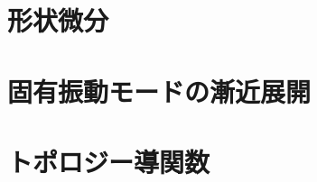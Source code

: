 \documentclass[titlepage,a4paper,12pt,oneside,dvipdfmx]{jsbook}
\begin{document}
\chapter{形状微分}




\chapter{固有振動モードの漸近展開}









\chapter{トポロジー導関数}

\end{document}
